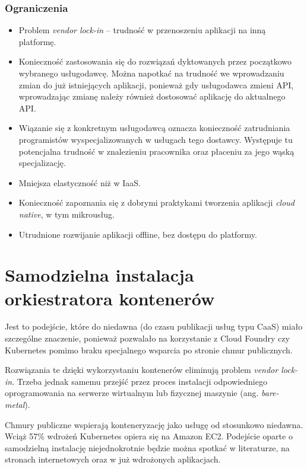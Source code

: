 \documentclass[12pt,a4paper,twoside,titlepage,openright]{book}
\begin{document}
\subsubsection{Ograniczenia}
\begin{itemize}
\item Problem \textit{vendor lock-in} -- trudność w przenoszeniu aplikacji na inną platformę.
\item Konieczność zastosowania się do rozwiązań dyktowanych przez początkowo wybranego usługodawcę. Można napotkać na trudność we wprowadzaniu zmian do już istniejących aplikacji, ponieważ gdy usługodawca zmieni API, wprowadzając zmianę należy również dostosować aplikację do aktualnego API.
\item Wiązanie się z konkretnym usługodawcą oznacza konieczność zatrudniania programistów wyspecjalizowanych w usługach tego dostawcy. Występuje tu potencjalna trudność w znalezieniu pracownika oraz płaceniu za jego wąską specjalizację.
\item Mniejsza elastyczność niż w IaaS.
\item Konieczność zapoznania się z dobrymi praktykami tworzenia aplikacji \textit{cloud native}, w tym mikrousług.
\item Utrudnione rozwijanie aplikacji offline, bez dostępu do platformy.
\end{itemize}

\section{Samodzielna instalacja orkiestratora kontenerów}\label{section:instalujKontenery}

Jest to podejście, które do niedawna (do czasu publikacji usług typu CaaS) miało szczególne znaczenie, ponieważ pozwalało na korzystanie z Cloud Foundry czy Kubernetes pomimo braku specjalnego wsparcia po stronie chmur publicznych. 

Rozwiązania te dzięki wykorzystaniu kontenerów eliminują problem \textit{vendor lock-in}. Trzeba jednak samemu przejść przez proces instalacji odpowiedniego oprogramowania na serwerze wirtualnym lub fizycznej maszynie (ang. \textit{bare-metal}).

Chmury publiczne wspierają konteneryzację jako usługę od stosunkowo niedawna. Wciąż 57\% wdrożeń Kubernetes opiera się na Amazon EC2. Podejście oparte o samodzielną instalację niejednokrotnie będzie można spotkać w literaturze, na stronach internetowych oraz w już wdrożonych aplikacjach.
\end{document}
